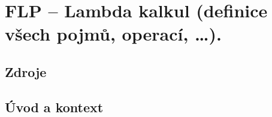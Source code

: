 

\graphicspath{{flp/lambda_kalkul/figures}}


\chapter{FLP -- Lambda kalkul (definice všech pojmů, operací, \dots).}


\section{Zdroje}

\begin{compactitem}
    \item {}
    \item {}
    \item {}
    \item {}
    \item {}
\end{compactitem}


\section{Úvod a kontext}

